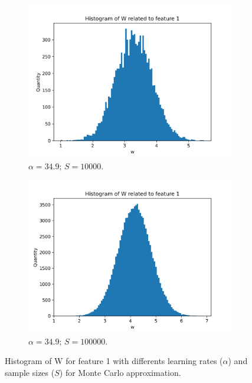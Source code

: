 \documentclass{article}
\begin{document}
\begin{figure}
\begin{subfigure}[t]{0.24\textwidth}
    \includegraphics[width=\linewidth]{hist_feat0_349000000_sample_10000.png}
    \caption{$\alpha = 34.9$; $S = 10000$.}
  \end{subfigure}
  \hfill
  \begin{subfigure}[t]{0.24\textwidth}
    \centering
    \includegraphics[width=\linewidth]{hist_feat0_349000000_sample_100000.png}
    \caption{$\alpha = 34.9$; $S = 100000$.}
  \end{subfigure}
  \caption{Histogram of W for feature 1 with differents learning rates ($\alpha$) and sample sizes ($S$) for Monte Carlo approximation.}
  \label{fig:hist_feat0}
\end{figure}
\end{document}
